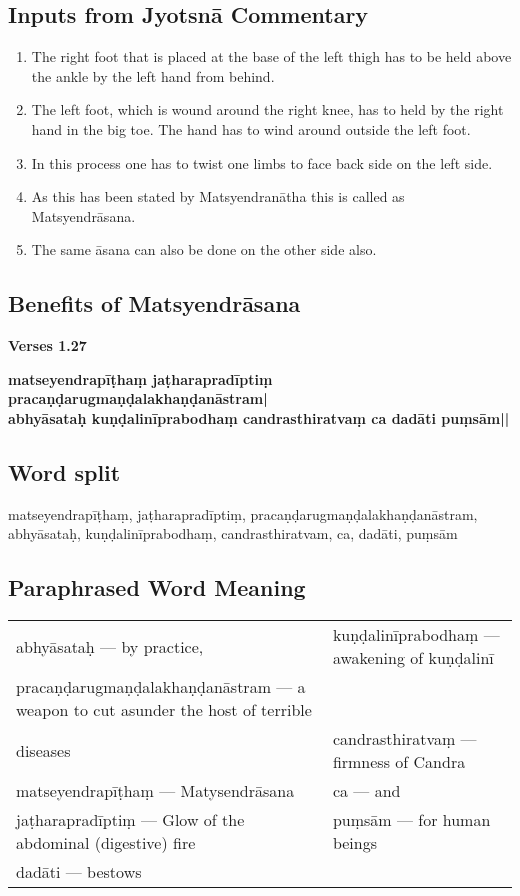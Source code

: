 \subsection*{Inputs from Jyotsnā Commentary}
\vspace{-10pt}

\begin{enumerate}
\itemsep=0pt
\item The right foot that is placed at the base of the left thigh has to be held above the ankle by the left hand from behind. 
\item The left foot, which is wound around the right knee, has to held by the right hand in the big toe. The hand has to wind around outside the left foot. 
\item In this process one has to twist one limbs to face back side on the left side.
\item As this has been stated by Matsyendranātha this is called as Matsyendrāsana. 
\item The same āsana can also be done on the other side also.  
\end{enumerate}

\subsection*{Benefits of Matsyendrāsana}

\noindent 
\textbf{Verses 1.27}

\begin{shloka}
\textbf{matseyendrapīṭhaṃ jaṭharapradīptiṃ pracaṇḍarugmaṇḍalakhaṇḍanāstram|}\\
\textbf{abhyāsataḥ kuṇḍalinīprabodhaṃ candrasthiratvaṃ ca dadāti puṃsām||}
\end{shloka}

\subsection*{Word split}

matseyendrapīṭhaṃ,  jaṭharapradīptiṃ,  pracaṇḍarugmaṇḍalakhaṇḍanāstram, 
abhyāsataḥ, kuṇḍalinīprabodhaṃ,  candrasthiratvam, ca, dadāti, puṃsām

\subsection*{Paraphrased Word Meaning}

\begin{longtable}{>{\noindent\raggedright}p{5cm}>{\noindent\raggedright}p{5cm}}
abhyāsataḥ --- by practice, & kuṇḍalinīprabodhaṃ --- awakening of kuṇḍalinī\tabularnewline
pracaṇḍarugmaṇḍala\-khaṇḍa\-nāstram --- a 
weapon to cut asunder the host  of terrible\tabularnewline 
diseases & candrasthiratvaṃ --- firmness  of Candra\tabularnewline
matseyendrapīṭhaṃ --- Matysendrāsana & ca --- and\tabularnewline
jaṭharapradīptiṃ --- Glow of the  abdominal (digestive) fire & puṃsām --- for human beings\tabularnewline
dadāti --- bestows & 
\end{longtable}
 
